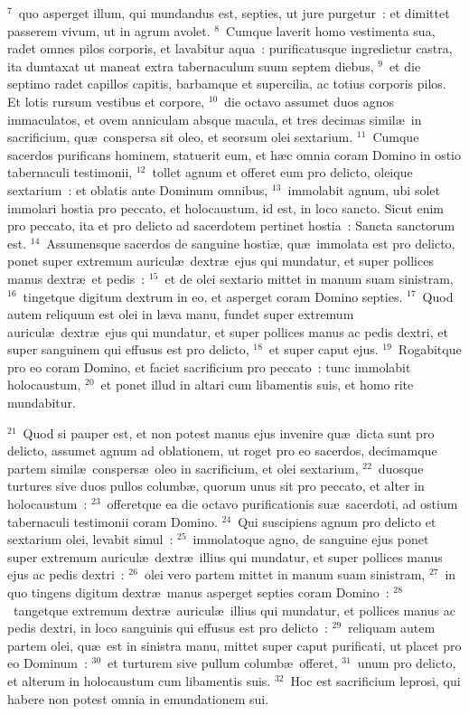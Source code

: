 ${}^{7}$~quo asperget illum, qui mundandus est, septies, ut jure purgetur~: et dimittet passerem vivum, ut in agrum avolet.
${}^{8}$~Cumque laverit homo vestimenta sua, radet omnes pilos corporis, et lavabitur aqua~: purificatusque ingredietur castra, ita dumtaxat ut maneat extra tabernaculum suum septem diebus,
${}^{9}$~et die septimo radet capillos capitis, barbamque et supercilia, ac totius corporis pilos. Et lotis rursum vestibus et corpore,
${}^{10}$~die octavo assumet duos agnos immaculatos, et ovem anniculam absque macula, et tres decimas simil\ae\ in sacrificium, qu\ae\ conspersa sit oleo, et seorsum olei sextarium.
${}^{11}$~Cumque sacerdos purificans hominem, statuerit eum, et h\ae c omnia coram Domino in ostio tabernaculi testimonii,
${}^{12}$~tollet agnum et offeret eum pro delicto, oleique sextarium~: et oblatis ante Dominum omnibus,
${}^{13}$~immolabit agnum, ubi solet immolari hostia pro peccato, et holocaustum, id est, in loco sancto. Sicut enim pro peccato, ita et pro delicto ad sacerdotem pertinet hostia~: Sancta sanctorum est.
${}^{14}$~Assumensque sacerdos de sanguine hosti\ae , qu\ae\ immolata est pro delicto, ponet super extremum auricul\ae\ dextr\ae\ ejus qui mundatur, et super pollices manus dextr\ae\ et pedis~:
${}^{15}$~et de olei sextario mittet in manum suam sinistram,
${}^{16}$~tingetque digitum dextrum in eo, et asperget coram Domino septies.
${}^{17}$~Quod autem reliquum est olei in l\ae va manu, fundet super extremum auricul\ae\ dextr\ae\ ejus qui mundatur, et super pollices manus ac pedis dextri, et super sanguinem qui effusus est pro delicto,
${}^{18}$~et super caput ejus.
${}^{19}$~Rogabitque pro eo coram Domino, et faciet sacrificium pro peccato~: tunc immolabit holocaustum,
${}^{20}$~et ponet illud in altari cum libamentis suis, et homo rite mundabitur.


${}^{21}$~Quod si pauper est, et non potest manus ejus invenire qu\ae\ dicta sunt pro delicto, assumet agnum ad oblationem, ut roget pro eo sacerdos, decimamque partem simil\ae\ conspers\ae\ oleo in sacrificium, et olei sextarium,
${}^{22}$~duosque turtures sive duos pullos columb\ae , quorum unus sit pro peccato, et alter in holocaustum~:
${}^{23}$~offeretque ea die octavo purificationis su\ae\ sacerdoti, ad ostium tabernaculi testimonii coram Domino.
${}^{24}$~Qui suscipiens agnum pro delicto et sextarium olei, levabit simul~:
${}^{25}$~immolatoque agno, de sanguine ejus ponet super extremum auricul\ae\ dextr\ae\ illius qui mundatur, et super pollices manus ejus ac pedis dextri~:
${}^{26}$~olei vero partem mittet in manum suam sinistram,
${}^{27}$~in quo tingens digitum dextr\ae\ manus asperget septies coram Domino~:
${}^{28}$~tangetque extremum dextr\ae\ auricul\ae\ illius qui mundatur, et pollices manus ac pedis dextri, in loco sanguinis qui effusus est pro delicto~:
${}^{29}$~reliquam autem partem olei, qu\ae\ est in sinistra manu, mittet super caput purificati, ut placet pro eo Dominum~:
${}^{30}$~et turturem sive pullum columb\ae\ offeret,
${}^{31}$~unum pro delicto, et alterum in holocaustum cum libamentis suis.
${}^{32}$~Hoc est sacrificium leprosi, qui habere non potest omnia in emundationem sui.


